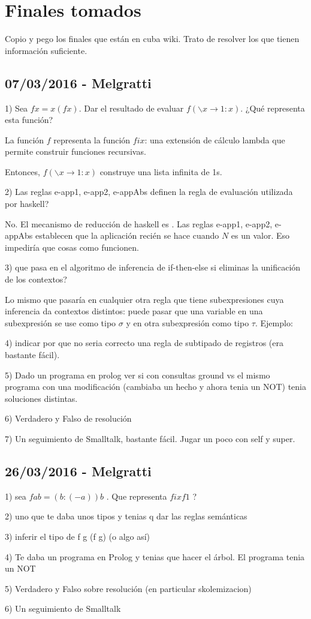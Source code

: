 \section{Finales tomados}

Copio y pego los finales que están en cuba wiki. Trato de resolver los que tienen información suficiente.

\subsection{07/03/2016 - Melgratti}

1) Sea $f x = x (f x)$. Dar el resultado de evaluar $f (\backslash x \to 1:x)$. ¿Qué representa esta función?

La función $f$ representa la función $fix$: una extensión de cálculo lambda que permite construir funciones recursivas.

Entonces, $f (\backslash x \to 1:x)$ construye una lista infinita de 1s.

2) Las reglas e-app1, e-app2, e-appAbs definen la regla de evaluación utilizada por haskell?

No. El mecanismo de reducción de haskell es . Las reglas e-app1, e-app2, e-appAbs establecen que la aplicación  recién se hace cuando $N$ es un valor. Eso impediría que cosas como  funcionen.

3) que pasa en el algoritmo de inferencia de if-then-else si eliminas la unificación de los contextos?

Lo mismo que pasaría en cualquier otra regla que tiene subexpresiones cuya inferencia da contextos distintos: puede pasar que una variable en una subexpresión se use como tipo $\sigma$ y en otra subexpresión como tipo $\tau$. Ejemplo: 

4) indicar por que no seria correcto una regla de subtipado de registros (era bastante fácil).

5) Dado un programa en prolog ver si con consultas ground vs el mismo programa con una modificación (cambiaba un hecho y ahora tenia un NOT) tenia soluciones distintas.

6) Verdadero y Falso de resolución

7) Un seguimiento de Smalltalk, bastante fácil. Jugar un poco con self y super.

\subsection{26/03/2016 - Melgratti}

1) sea $f a b = (b:(-a))b$ . Que representa $fix f 1$ ?

2) uno que te daba unos tipos y tenias q dar las reglas semánticas

3) inferir el tipo de f g (f g) (o algo así)

4) Te daba un programa en Prolog y tenias que hacer el árbol. El programa tenia un NOT

5) Verdadero y Falso sobre resolución (en particular skolemizacion)

6) Un seguimiento de Smalltalk
